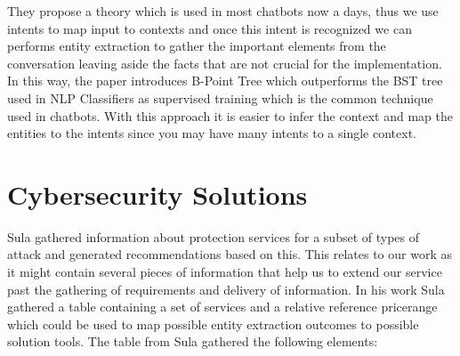 They propose a theory which is used in most chatbots now a days, thus we use intents to map input to contexts and once this intent is recognized we can performs entity extraction to gather the important elements from the conversation leaving aside the facts that are not crucial for the implementation. In this way, the paper introduces B-Point Tree which outperforms the BST tree used in NLP Classifiers as supervised training which is the common technique used in chatbots. With this approach it is easier to infer the context and map the entities to the intents since you may have many intents to a single context.

\section{Cybersecurity Solutions}

Sula \cite{recomendationSystem} gathered information about protection services for a subset of types of attack and generated recommendations based on this. This relates to our work as it might contain several pieces of information that help us to extend our service past the gathering of requirements and delivery of information. In his work Sula gathered a table containing a set of services and a relative reference pricerange which could be used to map possible entity extraction outcomes to possible solution tools. The table from Sula \cite{recomendationSystem} gathered the following elements:


